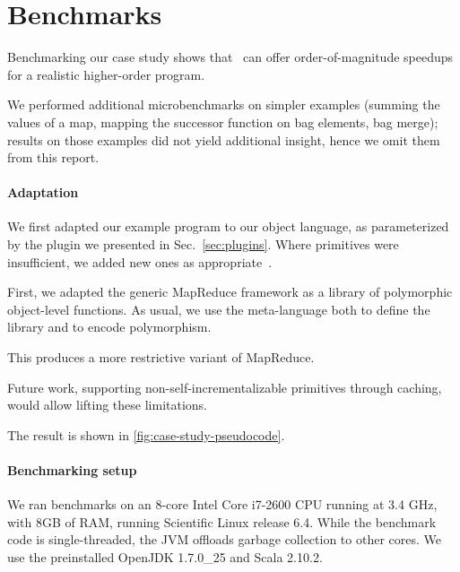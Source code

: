 \section{Benchmarks}

Benchmarking our case study shows
that \ILC\ can offer order-of-magnitude speedups for a
realistic higher-order program.

\begin{oldSec} %
We performed additional microbenchmarks on simpler examples
(summing the values of a map, mapping the successor function on bag elements, bag
merge);
results on those examples did not yield additional insight, hence
we omit them from this report.

\paragraph{Adaptation}
We first adapted our example program to our object language,
as parameterized by the plugin we presented in
Sec.~\ref{sec:plugins}. Where primitives were insufficient, we
added new ones as appropriate~.

First, we adapted the generic MapReduce framework as a library of
polymorphic object-level functions. As usual, we use the
meta-language both to define the library and to encode
polymorphism.

This produces a more restrictive variant of MapReduce. 

Future work, supporting non-self-incrementalizable primitives through caching, would allow lifting these limitations.

The result is shown in \cref{fig:case-study-pseudocode}.
\end{oldSec}

\paragraph{Benchmarking setup}
\begin{oldSec}
We ran benchmarks on an 8-core Intel Core i7-2600 CPU running at
3.4 GHz, with 8GB of RAM, running Scientific Linux release 6.4.
While the benchmark code is single-threaded, the JVM offloads
garbage collection to other cores. We use the preinstalled
OpenJDK 1.7.0\_25 and Scala 2.10.2.
\end{oldSec}

